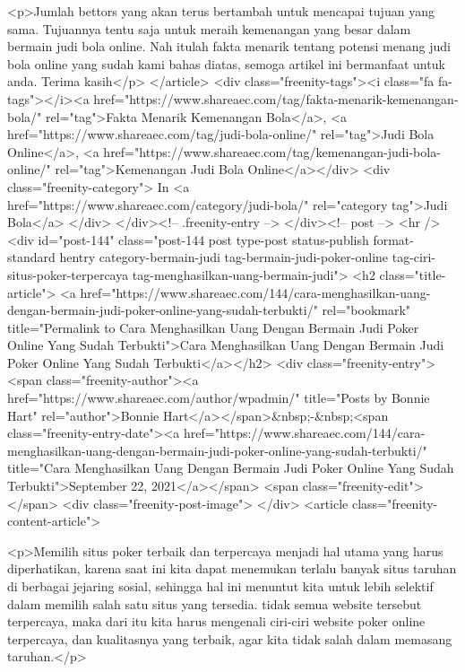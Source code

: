 {<p>Jumlah bettors yang akan terus bertambah untuk mencapai tujuan yang sama. Tujuannya tentu saja untuk meraih kemenangan yang besar dalam bermain judi bola online. Nah itulah fakta menarik tentang potensi menang judi bola online yang sudah kami bahas diatas, semoga artikel ini bermanfaat untuk anda. Terima kasih</p>
									</article>
																			<div class="freenity-tags"><i class="fa fa-tags"></i><a href="https://www.shareaec.com/tag/fakta-menarik-kemenangan-bola/" rel="tag">Fakta Menarik Kemenangan Bola</a>, <a href="https://www.shareaec.com/tag/judi-bola-online/" rel="tag">Judi Bola Online</a>, <a href="https://www.shareaec.com/tag/kemenangan-judi-bola-online/" rel="tag">Kemenangan Judi Bola Online</a></div>
																			<div class="freenity-category">
											In <a href="https://www.shareaec.com/category/judi-bola/" rel="category tag">Judi Bola</a>										</div>
																	</div><!-- .freenity-entry -->
							</div><!-- post -->
							<hr />
													<div id="post-144" class="post-144 post type-post status-publish format-standard hentry category-bermain-judi tag-bermain-judi-poker-online tag-ciri-situs-poker-terpercaya tag-menghasilkan-uang-bermain-judi">
								<h2 class="title-article">
									<a href="https://www.shareaec.com/144/cara-menghasilkan-uang-dengan-bermain-judi-poker-online-yang-sudah-terbukti/" rel="bookmark" title="Permalink to Cara Menghasilkan Uang Dengan Bermain Judi Poker Online Yang Sudah Terbukti">Cara Menghasilkan Uang Dengan Bermain Judi Poker Online Yang Sudah Terbukti</a></h2>
								<div class="freenity-entry">
									<span class="freenity-author"><a href="https://www.shareaec.com/author/wpadmin/" title="Posts by Bonnie Hart" rel="author">Bonnie Hart</a></span>&nbsp;-&nbsp;<span class="freenity-entry-date"><a href="https://www.shareaec.com/144/cara-menghasilkan-uang-dengan-bermain-judi-poker-online-yang-sudah-terbukti/" title="Cara Menghasilkan Uang Dengan Bermain Judi Poker Online Yang Sudah Terbukti">September 22, 2021</a></span>
									<span class="freenity-edit"> </span>
									<div class="freenity-post-image">  </div>
																		<article class="freenity-content-article">
										
<p>Memilih situs poker terbaik dan terpercaya menjadi hal utama yang harus diperhatikan, karena saat ini kita dapat menemukan terlalu banyak situs taruhan di berbagai jejaring sosial, sehingga hal ini menuntut kita untuk lebih selektif dalam memilih salah satu situs yang tersedia. tidak semua website tersebut terpercaya, maka dari itu kita harus mengenali ciri-ciri website poker online terpercaya, dan kualitasnya yang terbaik, agar kita tidak salah dalam memasang taruhan.</p>



}
